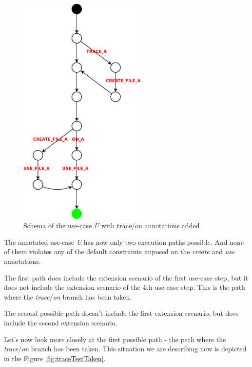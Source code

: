\begin{figure}[ht]
  \centering
  \includegraphics[width=180pt]{images/traceTest}
  \caption{Schema of the use-case \emph{U} with trace/on annotations added}
  \label{fig:traceTest}
\end{figure}

\newpage

The annotated use-case \emph{U} has now only two execution paths possible. And none of them violates any of the default constraints
imposed on the \emph{create} and \emph{use} annotations.

The first path does include the extension scenario of the first use-case
step, but it does not include the extension scenario of the 4th use-case step. This is the path where the \emph{trace}/\emph{on} branch
has been taken.

The second possible path doesn't include the first extension scenario, but does include the second extension scenario.


Let's now look more closely at the first possible path - the path where the \emph{trace}/\emph{on} branch has been taken.
This situation we are describing now is depicted in the Figure \ref{fig:traceTestTaken}.

\newpage

